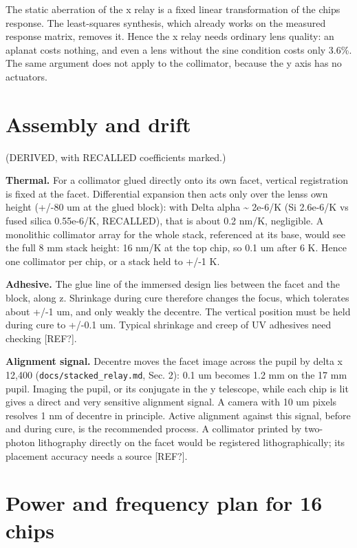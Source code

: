 The static aberration of the x relay is a fixed linear transformation of
the chip\textquotesingle s response. The least-squares synthesis, which
already works on the measured response matrix, removes it. Hence the x
relay needs ordinary lens quality: an aplanat costs nothing, and even a
lens without the sine condition costs only 3.6\%. The same argument does
not apply to the collimator, because the y axis has no actuators.

\hypertarget{7-assembly-and-drift}{%
\section{Assembly and drift}\label{collimator-7-assembly-and-drift}}

(DERIVED, with RECALLED coefficients marked.)

\textbf{Thermal.} For a collimator glued directly onto its own facet,
vertical registration is fixed at the facet. Differential expansion then
acts only over the lens\textquotesingle s own height (+/-80 um at the
glued block): with Delta alpha \textasciitilde{} 2e-6/K (Si 2.6e-6/K vs
fused silica 0.55e-6/K, RECALLED), that is about 0.2 nm/K, negligible. A
monolithic collimator array for the whole stack, referenced at its base,
would see the full 8 mm stack height: 16 nm/K at the top chip, so 0.1 um
after 6 K. Hence one collimator per chip, or a stack held to +/-1 K.

\textbf{Adhesive.} The glue line of the immersed design lies between the
facet and the block, along z. Shrinkage during cure therefore changes
the focus, which tolerates about +/-1 um, and only weakly the decentre.
The vertical position must be held during cure to +/-0.1 um. Typical
shrinkage and creep of UV adhesives need checking {[}REF?{]}.

\textbf{Alignment signal.} Decentre moves the facet image across the
pupil by delta x 12,400 (\texttt{docs/stacked\_relay.md}, Sec. 2): 0.1
um becomes 1.2 mm on the 17 mm pupil. Imaging the pupil, or its
conjugate in the y telescope, while each chip is lit gives a direct and
very sensitive alignment signal. A camera with 10 um pixels resolves 1
nm of decentre in principle. Active alignment against this signal,
before and during cure, is the recommended process. A collimator printed
by two-photon lithography directly on the facet would be registered
lithographically; its placement accuracy needs a source {[}REF?{]}.

\hypertarget{8-power-and-frequency-plan-for-16-chips}{%
\section{Power and frequency plan for 16
chips}\label{collimator-8-power-and-frequency-plan-for-16-chips}}

